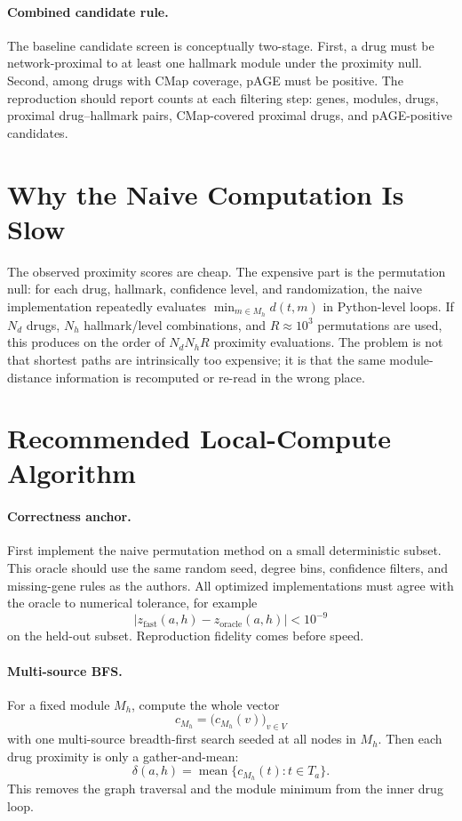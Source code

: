 \documentclass[11pt]{article}
\begin{document}
\paragraph{Combined candidate rule.}
The baseline candidate screen is conceptually two-stage. First, a drug must be
network-proximal to at least one hallmark module under the proximity null.
Second, among drugs with CMap coverage, pAGE must be positive. The reproduction
should report counts at each filtering step: genes, modules, drugs, proximal
drug--hallmark pairs, CMap-covered proximal drugs, and pAGE-positive candidates.

\section{Why the Naive Computation Is Slow}

The observed proximity scores are cheap. The expensive part is the permutation
null: for each drug, hallmark, confidence level, and randomization, the naive
implementation repeatedly evaluates
\(\min_{m\in M_h} d(t,m)\) in Python-level loops. If \(N_d\) drugs,
\(N_h\) hallmark/level combinations, and \(R\approx 10^3\) permutations are
used, this produces on the order of \(N_dN_hR\) proximity evaluations. The
problem is not that shortest paths are intrinsically too expensive; it is that
the same module-distance information is recomputed or re-read in the wrong
place.

\section{Recommended Local-Compute Algorithm}

\paragraph{Correctness anchor.}
First implement the naive permutation method on a small deterministic subset.
This oracle should use the same random seed, degree bins, confidence filters,
and missing-gene rules as the authors. All optimized implementations must agree
with the oracle to numerical tolerance, for example
\[
  |z_{\mathrm{fast}}(a,h)-z_{\mathrm{oracle}}(a,h)| < 10^{-9}
\]
on the held-out subset. Reproduction fidelity comes before speed.

\paragraph{Multi-source BFS.}
For a fixed module \(M_h\), compute the whole vector
\[
  c_{M_h} = \bigl(c_{M_h}(v)\bigr)_{v\in V}
\]
with one multi-source breadth-first search seeded at all nodes in \(M_h\). Then
each drug proximity is only a gather-and-mean:
\[
  \delta(a,h) = \operatorname{mean}\{c_{M_h}(t):t\in T_a\}.
\]
This removes the graph traversal and the module minimum from the inner drug
loop.
\end{document}

